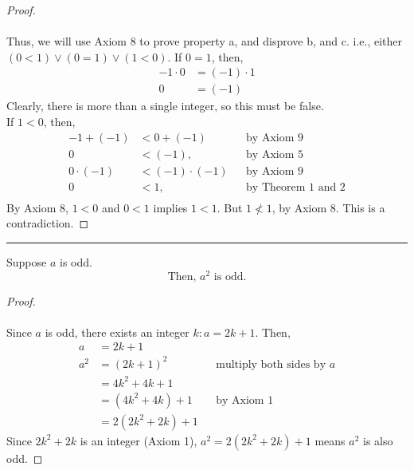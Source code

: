 \documentclass{article}
\def \proofDistance {5pt}
\newcommand{\proofseparator}{\par\noindent\rule{\textwidth}{0.4pt}}
\begin{document}
            \begin{proof}
                \mbox{}\\[-\baselineskip] \\
               Thus, we will use Axiom 8 to prove property a, and disprove b, and c. i.e., either $(0 < 1) \lor (0 = 1) \lor (1 < 0)$. If $0 = 1$, then,
                \begin{align*}
                    -1 \cdot 0 &= (-1) \cdot 1 \\
                    0 &= (-1)
                \end{align*}
                Clearly, there is more than a single integer, so this must be false. \\
                If $1 < 0$, then,
                \begin{align*}
                    -1 + (-1) &< 0 + (-1) && \text{by Axiom 9} \\
                    0 &< (-1), && \text{by Axiom 5} \\
                    0\cdot(-1) &< (-1)\cdot (-1) && \text{by Axiom 9} \\
                    0 &< 1, && \text{by Theorem 1 and 2} \\
                \end{align*}
                By Axiom 8, $1 < 0$ and $0 < 1$ implies $1 < 1$. But $1 \nless 1$, by Axiom 8. This is a contradiction.
            \end{proof}
        
            \proofseparator
        
            \begin{theorem}
                Suppose $a$ is odd. $$\text{Then, } a^2 \text{ is odd.}$$
            \end{theorem}
        
            \vspace{\proofDistance}
        
            \begin{proof}
                \mbox{}\\[-\baselineskip] \\
                Since $a$ is odd, there exists an integer $k \colon a = 2k + 1$. Then,
                \begin{align*}
                    a &= 2k + 1 \\
                    a^2 &= (2k+ 1)^2 && \text{multiply both sides by $a$} \\
                    &= 4k^2 +  4k + 1 \\
                    &= (4k^2 + 4k) + 1 && \text{by Axiom 1}\\
                    &= 2(2k^2 + 2k) + 1
                \end{align*}
                Since $2k^2 + 2k$ is an integer (Axiom 1), $a^2 = 2(2k^2 + 2k) + 1$ means $a^2$ is also odd.
            \end{proof}
        
\end{document}
